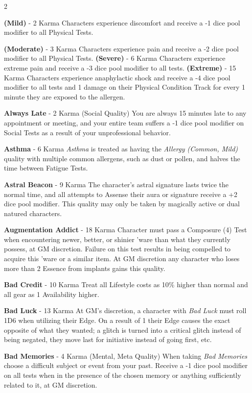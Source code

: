 \documentclass[
  oneside]{article}
\begin{document}
\begin{multicols}{2}

\textbf{(Mild)} - 2 Karma Characters experience
discomfort and receive a -1 dice pool modifier to
all Physical Tests.

\textbf{(Moderate)} - 3 Karma Characters
experience pain and receive a -2 dice pool
modifier to all Physical Tests. \textbf{(Severe)}
- 6 Karma Characters experience extreme pain and
receive a -3 dice pool modifier to all tests.
\textbf{(Extreme)} - 15 Karma Characters
experience anaphylactic shock and receive a -4
dice pool modifier to all tests and 1 damage on
their Physical Condition Track for every 1 minute
they are exposed to the allergen.

\textbf{Always Late} - 2 Karma (Social Quality)
You are always 15 minutes late to any appointment
or meeting, and your entire team suffers a -1 dice
pool modifier on Social Tests as a result of your
unprofessional behavior.

\textbf{Asthma} - 6 Karma \emph{Asthma} is treated
as having the \emph{Allergy (Common, Mild)}
quality with multiple common allergens, such as
dust or pollen, and halves the time between
Fatigue Tests.

\textbf{Astral Beacon} - 9 Karma The character's
astral signature lasts twice the normal time, and
all attempts to Assense their aura or signature
receive a +2 dice pool modifier. This quality may
only be taken by magically active or dual natured
characters.

\textbf{Augmentation Addict} - 18 Karma Character
must pass a Composure (4) Test when encountering
newer, better, or shinier 'ware than what they
currently possess, at GM discretion. Failure on
this test results in being compelled to acquire
this 'ware or a similar item. At GM discretion any
character who loses more than 2 Essence from
implants gains this quality.

\textbf{Bad Credit} - 10 Karma Treat all Lifestyle
costs as 10\% higher than normal and all gear as 1
Availability higher.

\textbf{Bad Luck} - 13 Karma At GM's discretion, a
character with \emph{Bad Luck} must roll 1D6 when
utilizing their Edge. On a result of 1 their Edge
causes the exact opposite of what they wanted; a
glitch is turned into a critical glitch instead of
being negated, they move last for initiative
instead of going first, etc.

\textbf{Bad Memories} - 4 Karma (Mental, Meta
Quality) When taking \emph{Bad Memories} choose a
difficult subject or event from your past. Receive
a -1 dice pool modifier on all tests when in the
presence of the chosen memory or anything
sufficiently related to it, at GM discretion.


\end{multicols}
\end{document}
